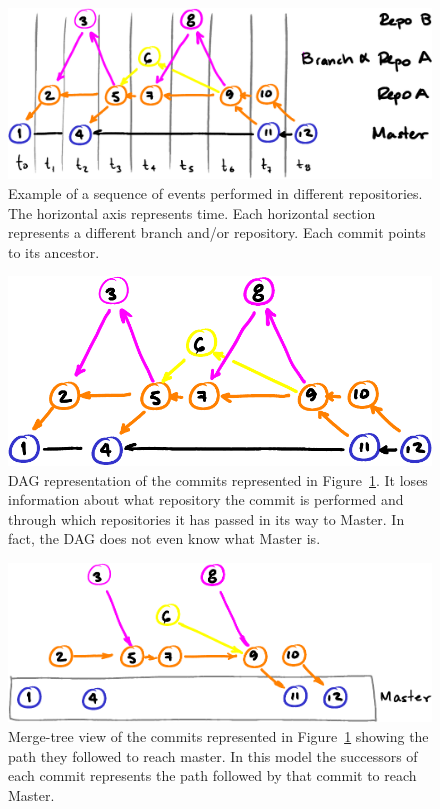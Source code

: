 \documentclass[conference, draftclsnofoot, draft]{IEEEtran}
\begin{document}
\begin{figure}[htbp]
        \centering
        \includegraphics[width=\columnwidth]{figures/events.pdf}
        \caption{Example of a sequence of events performed in different
                repositories. The horizontal axis represents time. Each horizontal
                section represents a different branch and/or repository. Each commit
                points to its ancestor.}
        \label{fig:repoEvents}
\end{figure}

\begin{figure}[htbp]
        \centering
        \includegraphics[width=.8\columnwidth]{figures/dag.pdf}
        \caption{DAG representation of the commits represented in
                Figure~\ref{fig:repoEvents}. It loses information about what
                repository the commit is performed and through which repositories it
                has passed in its way to Master. In fact, the DAG does not even know
                what Master is.}
        \label{fig:repoDAG}
\end{figure}

\begin{figure}[htbp]
        \centering
        \includegraphics[width=\columnwidth]{figures/tree.pdf}
        \caption{Merge-tree view of the commits  represented in
                Figure~\ref{fig:repoEvents} showing the path they followed to reach
                master. In this model the successors of each commit represents the
                path followed by that commit to reach Master.}
        \label{fig:repoTree}
\end{figure}
\end{document}
